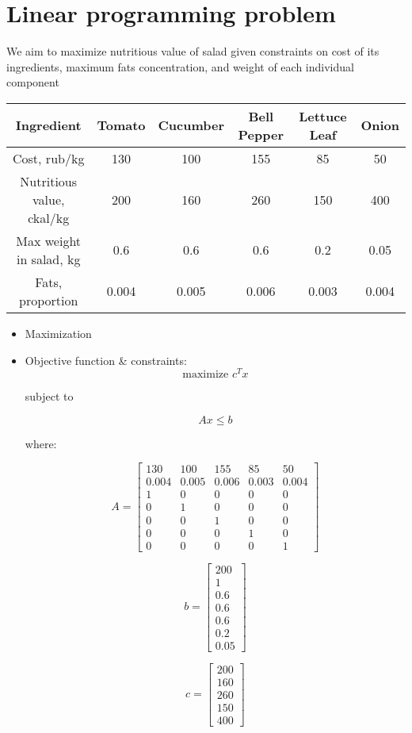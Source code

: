 \documentclass{article}
\begin{document}
\section{Linear programming problem}
We aim to maximize nutritious value of salad given constraints on cost of its ingredients, maximum fats concentration, and weight of each individual component
\begin{center}
\begin{tabular}{|c||c|c|c|c|c|}
\hline

     Ingredient & Tomato & Cucumber & Bell Pepper & Lettuce Leaf & Onion \\
\hline \hline
     Cost, rub/kg & 130 & 100 & 155 & 85 & 50 \\
\hline
     Nutritious value, ckal/kg & 200 & 160 & 260 & 150 & 400 \\
\hline
     Max weight in salad, kg & 0.6 & 0.6 & 0.6 & 0.2 & 0.05 \\
\hline
     Fats, proportion & 0.004 & 0.005 & 0.006 & 0.003 & 0.004 \\ 
\hline
\end{tabular}
\end{center}
\begin{itemize}
    \item Maximization
    \item Objective function \& constraints:
\[
\text{maximize } c^T x
\]

subject to

\[
Ax \leq b
\]

where:

\[
A = \begin{bmatrix}
130 & 100 & 155 & 85 & 50 \\
0.004 & 0.005 & 0.006 & 0.003 & 0.004 \\
1 & 0 & 0 & 0 & 0 \\
0 & 1 & 0 & 0 & 0 \\
0 & 0 & 1 & 0 & 0 \\
0 & 0 & 0 & 1 & 0 \\
0 & 0 & 0 & 0 & 1
\end{bmatrix}
\]

\[
b = \begin{bmatrix}
200 \\
1 \\
0.6 \\
0.6 \\
0.6 \\
0.2 \\
0.05
\end{bmatrix}
\]

\[
c = \begin{bmatrix}
200 \\
160 \\
260 \\
150 \\
400
\end{bmatrix}
\]
\end{itemize}
\end{document}
